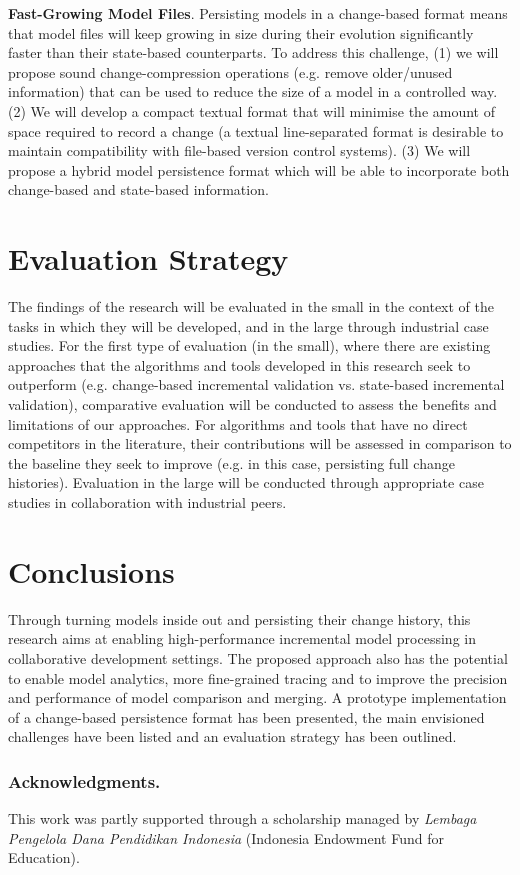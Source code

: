 \documentclass{llncs}
\begin{document}
\textbf{Fast-Growing Model Files}. Persisting models in a change-based format means that model files will keep growing in size during their evolution significantly faster than their state-based counterparts. To address this challenge, (1) we will propose sound change-compression operations (e.g. remove older/unused information) that can be used to reduce the size of a model in a controlled way. (2) We will develop a compact textual format that will minimise the amount of space required to record a change (a textual line-separated format is desirable to maintain compatibility with file-based version control systems). (3) We will propose a hybrid model persistence format which will be able to incorporate both change-based and state-based information. 

\section{Evaluation Strategy}
\label{sec:evaluation_strategy}
The findings of the research will be evaluated in the small in the context of the tasks in which they will be developed, and in the large through industrial case studies. For the first type of evaluation (in the small), where there are existing approaches that the algorithms and tools developed in this research seek to outperform (e.g. change-based incremental validation vs. state-based incremental validation), comparative evaluation will be conducted to assess the benefits and limitations of our approaches. For algorithms and tools that have no direct competitors in the literature, their contributions will be assessed in comparison to the baseline they seek to improve (e.g. in this case, persisting full change histories). Evaluation in the large will be conducted through appropriate case studies in collaboration with industrial peers.

\section{Conclusions}
\label{sec:conclusions}
Through turning models inside out and persisting their change history, this research aims at enabling high-performance incremental model processing in collaborative development settings. The proposed approach also has the potential to enable model analytics, more fine-grained tracing and to improve the precision and performance of model comparison and merging. A prototype implementation of a change-based persistence format has been presented, the main envisioned challenges have been listed and an evaluation strategy has been outlined. %

\subsubsection*{Acknowledgments.} This work was partly supported through a scholarship managed by \emph{Lembaga Pengelola Dana Pendidikan Indonesia} (Indonesia Endowment Fund for Education).

 

\end{document}
